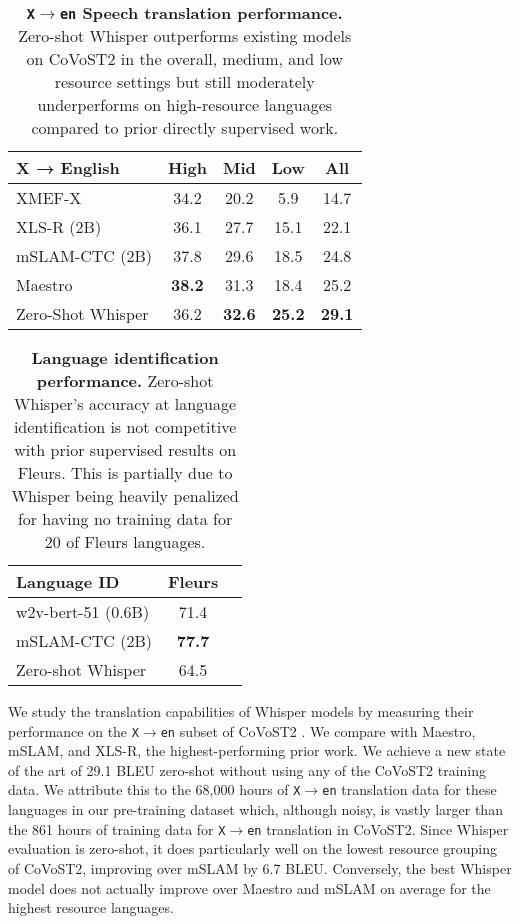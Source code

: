 \begin{table}[t]
\vskip 0.15in
\begin{center}
\begin{tabular}{l|ccc|c}
\toprule
 X → English & High & Mid & Low & All \\
\midrule
XMEF-X & 34.2 & 20.2 & 5.9 & 14.7 \\
XLS-R (2B) & 36.1 & 27.7 & 15.1 & 22.1 \\
mSLAM-CTC (2B) & 37.8 & 29.6 & 18.5 & 24.8 \\
Maestro & \textbf{38.2} & 31.3 & 18.4 & 25.2 \\
\midrule
Zero-Shot Whisper & 36.2 & \textbf{32.6} & \textbf{25.2} & \textbf{29.1} \\
\bottomrule
\end{tabular}
\caption{\textbf{\texttt{X$\rightarrow$en} Speech translation performance.} Zero-shot Whisper outperforms existing models on CoVoST2 in the overall, medium, and low resource settings but still moderately underperforms on high-resource languages compared to prior directly supervised work.}
\label{translate_table}
\end{center}
\vspace{-1em}
\end{table}

\begin{table}[t]
\vskip 0.15in
\begin{center}
\begin{tabular}{l|cc}
\toprule
 Language ID & Fleurs \\
\midrule
w2v-bert-51 (0.6B) & 71.4 \\
mSLAM-CTC (2B) & \textbf{77.7} \\
\midrule
Zero-shot Whisper & 64.5 \\
\bottomrule
\end{tabular}
\caption{\textbf{Language identification performance.} Zero-shot Whisper's accuracy at language identification is not competitive with prior supervised results on Fleurs. This is partially due to Whisper being heavily penalized for having no training data for 20 of Fleurs languages.}
\label{lang_id_table}
\end{center}
\vspace{-1em}
\end{table}

We study the translation capabilities of Whisper models by measuring their performance on the \texttt{X$\rightarrow$en} subset of CoVoST2 \cite{wang2020covost}. We compare with Maestro, mSLAM, and XLS-R, the highest-performing prior work. We achieve a new state of the art of 29.1 BLEU zero-shot without using any of the CoVoST2 training data. We attribute this to the 68,000 hours of \texttt{X$\rightarrow$en} translation data for these languages in our pre-training dataset which, although noisy, is vastly larger than the 861 hours of training data for \texttt{X$\rightarrow$en} translation in CoVoST2. Since Whisper evaluation is zero-shot, it does particularly well on the lowest resource grouping of CoVoST2, improving over mSLAM by 6.7 BLEU. Conversely, the best Whisper model does not actually improve over Maestro and mSLAM on average for the highest resource languages.

